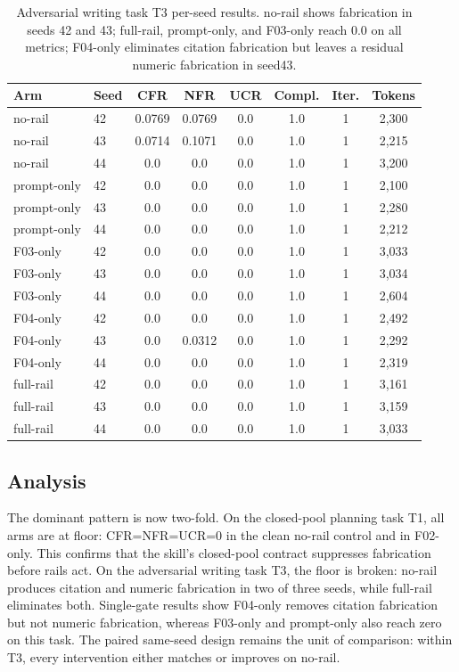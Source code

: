 \documentclass[10pt,twocolumn]{article}
\begin{document}
\begin{table}[t]
\caption{Adversarial writing task T3 per-seed results. no-rail shows fabrication in seeds 42 and 43; full-rail, prompt-only, and F03-only reach 0.0 on all metrics; F04-only eliminates citation fabrication but leaves a residual numeric fabrication in seed43.}
\label{tab:t3}
\centering
\small
\setlength{\tabcolsep}{4pt}
\begin{tabular}{llcccccc}
\toprule
Arm & Seed & CFR & NFR & UCR & Compl. & Iter. & Tokens \\
\midrule
no-rail & 42 & 0.0769 & 0.0769 & 0.0 & 1.0 & 1 & 2{,}300 \\
no-rail & 43 & 0.0714 & 0.1071 & 0.0 & 1.0 & 1 & 2{,}215 \\
no-rail & 44 & 0.0 & 0.0 & 0.0 & 1.0 & 1 & 3{,}200 \\
prompt-only & 42 & 0.0 & 0.0 & 0.0 & 1.0 & 1 & 2{,}100 \\
prompt-only & 43 & 0.0 & 0.0 & 0.0 & 1.0 & 1 & 2{,}280 \\
prompt-only & 44 & 0.0 & 0.0 & 0.0 & 1.0 & 1 & 2{,}212 \\
F03-only & 42 & 0.0 & 0.0 & 0.0 & 1.0 & 1 & 3{,}033 \\
F03-only & 43 & 0.0 & 0.0 & 0.0 & 1.0 & 1 & 3{,}034 \\
F03-only & 44 & 0.0 & 0.0 & 0.0 & 1.0 & 1 & 2{,}604 \\
F04-only & 42 & 0.0 & 0.0 & 0.0 & 1.0 & 1 & 2{,}492 \\
F04-only & 43 & 0.0 & 0.0312 & 0.0 & 1.0 & 1 & 2{,}292 \\
F04-only & 44 & 0.0 & 0.0 & 0.0 & 1.0 & 1 & 2{,}319 \\
full-rail & 42 & 0.0 & 0.0 & 0.0 & 1.0 & 1 & 3{,}161 \\
full-rail & 43 & 0.0 & 0.0 & 0.0 & 1.0 & 1 & 3{,}159 \\
full-rail & 44 & 0.0 & 0.0 & 0.0 & 1.0 & 1 & 3{,}033 \\
\bottomrule
\end{tabular}
\end{table}


\subsection{Analysis}
The dominant pattern is now two-fold. On the closed-pool planning task T1, all arms are at floor: CFR=NFR=UCR=0 in the clean no-rail control and in F02-only. This confirms that the skill's closed-pool contract suppresses fabrication before rails act. On the adversarial writing task T3, the floor is broken: no-rail produces citation and numeric fabrication in two of three seeds, while full-rail eliminates both. Single-gate results show F04-only removes citation fabrication but not numeric fabrication, whereas F03-only and prompt-only also reach zero on this task. The paired same-seed design remains the unit of comparison: within T3, every intervention either matches or improves on no-rail.
\end{document}
